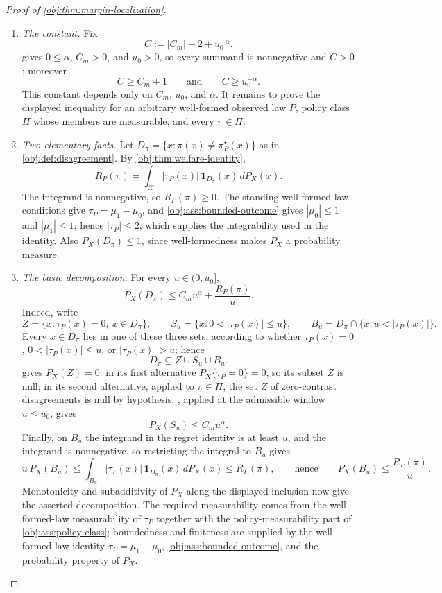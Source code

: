 \documentclass[11pt]{article}
\begin{document}
\begin{proof}[Proof of \cref{obj:thm:margin-localization}]
\begin{enumerate}
\item \emph{The constant.}  Fix
\[
C:=|C_m|+2+u_0^{-\alpha}.
\]
 gives \(0\le\alpha\), \(C_m>0\), and \(u_0>0\), so every summand is nonnegative and \(C>0\); moreover
\[
C\ge C_m+1
\qquad\text{and}\qquad
C\ge u_0^{-\alpha}.
\]
This constant depends only on \(C_m\), \(u_0\), and \(\alpha\).  It remains to prove the displayed inequality for an arbitrary well-formed observed law \(P\), policy class \(\Pi\) whose members are measurable, and every \(\pi\in\Pi\). %

\item \emph{Two elementary facts.}  Let \(D_\pi=\{x:\pi(x)\ne\pi^\star_P(x)\}\) as in \cref{obj:def:disagreement}.  By \cref{obj:thm:welfare-identity},
\[
R_P(\pi)=\int_{\mathcal X} |\tau_P(x)|\,\mathbf 1_{D_\pi}(x)\,dP_X(x).
\]
The integrand is nonnegative, so \(R_P(\pi)\ge0\).  The standing well-formed-law conditions give \(\tau_P=\mu_1-\mu_0\), and \cref{obj:ass:bounded-outcome} gives \(|\mu_0|\le1\) and \(|\mu_1|\le1\); hence \(|\tau_P|\le2\), which supplies the integrability used in the identity.  Also \(P_X(D_\pi)\le1\), since well-formedness makes \(P_X\) a probability measure. %

\item \emph{The basic decomposition.}  For every \(u\in(0,u_0]\),
\[
P_X(D_\pi)\le C_m u^\alpha+\frac{R_P(\pi)}{u}.
\]
Indeed, write
\[
Z=\{x:\tau_P(x)=0,\ x\in D_\pi\},\qquad
S_u=\{x:0<|\tau_P(x)|\le u\},\qquad
B_u=D_\pi\cap\{x:u<|\tau_P(x)|\}.
\]
Every \(x\in D_\pi\) lies in one of these three sets, according to whether \(\tau_P(x)=0\), \(0<|\tau_P(x)|\le u\), or \(|\tau_P(x)|>u\); hence
\[
D_\pi\subseteq Z\cup S_u\cup B_u .
\]
 gives \(P_X(Z)=0\): in its first alternative \(P_X\{\tau_P=0\}=0\), so its subset \(Z\) is null; in its second alternative, applied to \(\pi\in\Pi\), the set \(Z\) of zero-contrast disagreements is null by hypothesis.  , applied at the admissible window \(u\le u_0\), gives
\[
P_X(S_u)\le C_m u^\alpha .
\]
Finally, on \(B_u\) the integrand in the regret identity is at least \(u\), and the integrand is nonnegative, so restricting the integral to \(B_u\) gives
\[
u\,P_X(B_u)\le \int_{B_u}|\tau_P(x)|\,\mathbf 1_{D_\pi}(x)\,dP_X(x)\le R_P(\pi),
\qquad\text{hence}\qquad
P_X(B_u)\le \frac{R_P(\pi)}u .
\]
Monotonicity and subadditivity of \(P_X\) along the displayed inclusion now give the asserted decomposition.  The required measurability comes from the well-formed-law measurability of \(\tau_P\) together with the policy-measurability part of \cref{obj:ass:policy-class}; boundedness and finiteness are supplied by the well-formed-law identity \(\tau_P=\mu_1-\mu_0\), \cref{obj:ass:bounded-outcome}, and the probability property of \(P_X\). %


\end{enumerate}
\end{proof}
\end{document}
